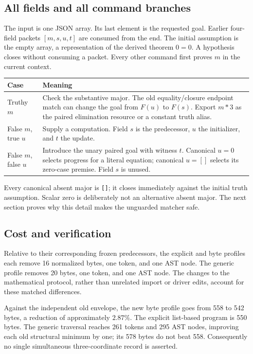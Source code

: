 \subsection{All fields and all command branches}
The input is one JSON array. Its last element is the requested goal.
Earlier four-field packets $[m,s,u,t]$ are consumed from the end.
The initial assumption is the empty array, a representation of the
derived theorem $0=0$. A hypothesis closes without consuming a packet.
Every other command first proves $m$ in the current context.

\begin{center}\small
\begin{tabularx}{\linewidth}{@{}lX@{}}
\toprule
Case & Meaning\\\midrule
Truthy $m$ & Check the substantive major. The old equality/closure endpoint
match can change the goal from $F(u)$ to $F(s)$. Export $m*3$ as the
paired elimination resource or a constant truth alias.\\[3pt]
False $m$, true $u$ & Supply a computation. Field $s$ is the predecessor,
$u$ the initializer, and $t$ the update.\\[3pt]
False $m$, false $u$ & Introduce the unary paired goal with witness $t$.
Canonical $u=0$ selects progress for a literal equation;
canonical $u=[]$ selects its zero-case premise. Field $s$ is unused.\\
\bottomrule
\end{tabularx}
\end{center}

Every canonical absent major is \texttt{[]}; it closes immediately
against the initial truth assumption. Scalar zero is deliberately not
an alternative absent major. The next section proves why this detail
makes the unguarded matcher safe.

\subsection{Cost and verification}
Relative to their corresponding frozen predecessors, the explicit and
byte profiles each remove 16 normalized bytes, one token, and one AST
node. The generic profile removes 20 bytes, one token, and one AST node.
The changes to the mathematical protocol, rather than unrelated import
or driver edits, account for these matched differences.

Against the independent old envelope, the new byte profile goes from
558 to 542 bytes, a reduction of approximately $2.87\%$. The explicit
list-based program is 550 bytes. The generic traversal reaches 261
tokens and 295 AST nodes, improving each old structural minimum by one;
its 578 bytes do not beat 558. Consequently no single simultaneous
three-coordinate record is asserted.

